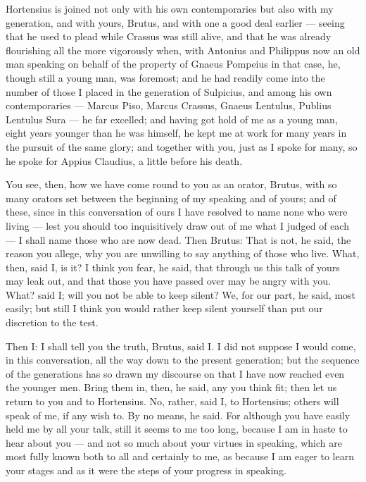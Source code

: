  Hortensius is joined not only with his own contemporaries but also with my generation, and with yours, Brutus, and with one a good deal earlier — seeing that he used to plead while Crassus was still alive, and that he was already flourishing all the more vigorously when, with Antonius and Philippus now an old man speaking on behalf of the property of Gnaeus Pompeius in that case, he, though still a young man, was foremost; and he had readily come into the number of those I placed in the generation of Sulpicius, and among his own contemporaries — Marcus Piso, Marcus Crassus, Gnaeus Lentulus, Publius Lentulus Sura — he far excelled; and having got hold of me as a young man, eight years younger than he was himself, he kept me at work for many years in the pursuit of the same glory; and together with you, just as I spoke for many, so he spoke for Appius Claudius, a little before his death.

 You see, then, how we have come round to you as an orator, Brutus, with so many orators set between the beginning of my speaking and of yours; and of these, since in this conversation of ours I have resolved to name none who were living — lest you should too inquisitively draw out of me what I judged of each — I shall name those who are now dead. Then Brutus: That is not, he said, the reason you allege, why you are unwilling to say anything of those who live. What, then, said I, is it? I think you fear, he said, that through us this talk of yours may leak out, and that those you have passed over may be angry with you. What? said I; will you not be able to keep silent? We, for our part, he said, most easily; but still I think you would rather keep silent yourself than put our discretion to the test.

 Then I: I shall tell you the truth, Brutus, said I. I did not suppose I would come, in this conversation, all the way down to the present generation; but the sequence of the generations has so drawn my discourse on that I have now reached even the younger men. Bring them in, then, he said, any you think fit; then let us return to you and to Hortensius. No, rather, said I, to Hortensius; others will speak of me, if any wish to. By no means, he said. For although you have easily held me by all your talk, still it seems to me too long, because I am in haste to hear about you — and not so much about your virtues in speaking, which are most fully known both to all and certainly to me, as because I am eager to learn your stages and as it were the steps of your progress in speaking.

